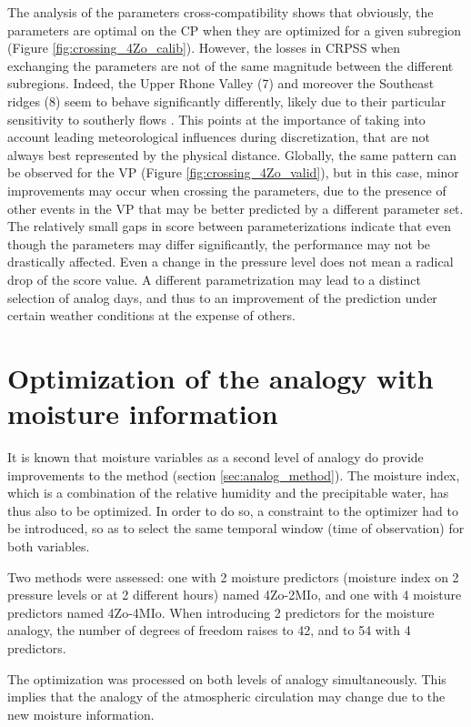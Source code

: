 \documentclass[review]{elsarticle}
\begin{document}
The analysis of the parameters cross-compatibility shows that obviously, the parameters are optimal on the CP when they are optimized for a given subregion (Figure \ref{fig:crossing_4Zo_calib}). However, the losses in CRPSS when exchanging the parameters are not of the same magnitude between the different subregions. Indeed, the Upper Rhone Valley (7) and moreover the Southeast ridges (8) seem to behave significantly differently, likely due to their particular sensitivity to southerly flows \citep{Horton2012}. This points at the importance of taking into account leading meteorological influences during discretization, that are not always best represented by the physical distance. Globally, the same pattern can be observed for the VP (Figure \ref{fig:crossing_4Zo_valid}), but in this case, minor improvements may occur when crossing the parameters, due to the presence of other events in the VP that may be better predicted by a different parameter set. The relatively small gaps in score between parameterizations indicate that even though the parameters may differ significantly, the performance may not be drastically affected. Even a change in the pressure level does not mean a radical drop of the score value. A different parametrization may lead to a distinct selection of analog days, and thus to an improvement of the prediction under certain weather conditions at the expense of others.


\section{Optimization of the analogy with moisture information}
\label{sec:optim_moisture}

It is known that moisture variables as a second level of analogy do provide improvements to the method (section \ref{sec:analog_method}). The moisture index, which is a combination of the relative humidity and the precipitable water, has thus also to be optimized. In order to do so, a constraint to the optimizer had to be introduced, so as to select the same temporal window (time of observation) for both variables. 

Two methods were assessed: one with 2 moisture predictors (moisture index on 2 pressure levels or at 2 different hours) named 4Zo-2MIo, and one with 4 moisture predictors named 4Zo-4MIo. When introducing 2 predictors for the moisture analogy, the number of degrees of freedom raises to 42, and to 54 with 4 predictors.

The optimization was processed on both levels of analogy simultaneously. This implies that the analogy of the atmospheric circulation may change due to the new moisture information.
\end{document}
